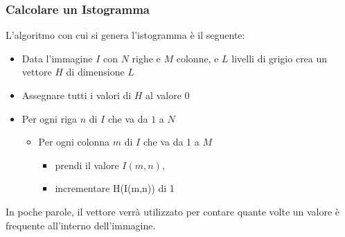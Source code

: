\documentclass{report}
\begin{document}
\subsubsection{Calcolare un Istogramma}
\label{sec:calc-isto}
L'algoritmo con cui si genera l'istogramma è il seguente:
\begin{itemize}
\item Data l'immagine $I$ con $N$ righe e $M$ colonne, e $L$ livelli di
  grigio crea un vettore $H$ di dimensione $L$
\item Assegnare tutti i valori di $H$ al valore 0
\item Per ogni riga $n$ di $I$ che va da $1$ a $N$
  \begin{itemize}
  \item Per ogni colonna $m$ di $I$ che va da 1 a $M$
    \begin{itemize}
    \item prendi il valore $I(m,n)$,
    \item incrementare H(I(m,n)) di 1
    \end{itemize}
  \end{itemize}
\end{itemize}
In poche parole, il vettore verrà utilizzato per contare quante volte un
valore è frequente all'interno dell'immagine.
\end{document}
